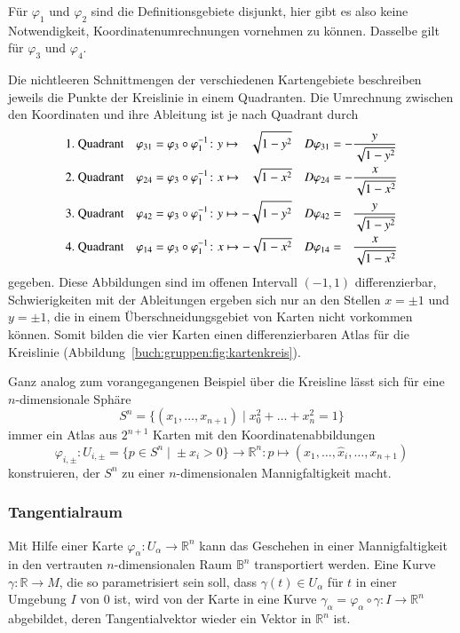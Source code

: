 \begin{beispiel}
Für $\varphi_1$ und $\varphi_2$ sind die Definitionsgebiete disjunkt,
hier gibt es also keine Notwendigkeit, Koordinatenumrechnungen vornehmen
zu können.
Dasselbe gilt für $\varphi_3$ und $\varphi_4$.

Die nichtleeren Schnittmengen der verschiedenen Kartengebiete beschreiben
jeweils die Punkte der Kreislinie in einem Quadranten.
Die Umrechnung zwischen den Koordinaten und ihre Ableitung
ist je nach Quadrant durch
\begin{align*}
&\text{1.~Quadrant}&
\varphi_{31}
&=
\varphi_3\circ\varphi_1^{-1}\colon y\mapsto\phantom{-}\sqrt{1-y^2\mathstrut}
&
D\varphi_{31}
&=
-\frac{y}{\sqrt{1-y^2\mathstrut}}
\\
&\text{2.~Quadrant}&
\varphi_{24}
&=
\varphi_3\circ\varphi_1^{-1}\colon x\mapsto\phantom{-}\sqrt{1-x^2\mathstrut}
&
D\varphi_{24}
&=
-\frac{x}{\sqrt{1-x^2\mathstrut}}
\\
&\text{3.~Quadrant}&
\varphi_{42}
&=
\varphi_3\circ\varphi_1^{-1}\colon y\mapsto-\sqrt{1-y^2\mathstrut}
&
D\varphi_{42}
&=
\phantom{-}\frac{y}{\sqrt{1-y^2\mathstrut}}
\\
&\text{4.~Quadrant}&
\varphi_{14}
&=
\varphi_3\circ\varphi_1^{-1}\colon x\mapsto-\sqrt{1-x^2\mathstrut}
&
D\varphi_{14}
&=
\phantom{-}\frac{x}{\sqrt{1-x^2\mathstrut}}
\end{align*}
gegeben.
Diese Abbildungen sind im offenen Intervall $(-1,1)$ differenzierbar,
Schwierigkeiten mit der Ableitungen ergeben sich nur an den Stellen
$x=\pm1$ und $y=\pm 1$, die in einem Überschneidungsgebiet von Karten
nicht vorkommen können.
Somit bilden die vier Karten einen differenzierbaren Atlas für
die Kreislinie (Abbildung~\ref{buch:gruppen:fig:kartenkreis}).
\end{beispiel}

\begin{beispiel}
Ganz analog zum vorangegangenen Beispiel über die Kreisline lässt sich
für eine $n$-di\-men\-sio\-nale Sphäre
\[
S^n = \{ (x_1,\dots,x_{n+1})\;|\; x_0^2+\dots+x_n^2=1\}
\]
immer ein Atlas aus $2^{n+1}$ Karten mit den Koordinatenabbildungen
\[
\varphi_{i,\pm}
\colon
U_{i,\pm}
=
\{p\in S^n\;|\; \pm x_i >0\}
\to
\mathbb{R}^n
:
p\mapsto (x_1,\dots,\hat{x}_i,\dots,x_{n+1})
\]
konstruieren, der $S^n$ zu einer $n$-dimensionalen Mannigfaltigkeit macht.
\end{beispiel}

\subsubsection{Tangentialraum}
Mit Hilfe einer Karte $\varphi_\alpha\colon U_\alpha\to\mathbb{R}^n$
kann das Geschehen in einer Mannigfaltigkeit in den vertrauten 
$n$-dimensionalen Raum $\mathbb{B}^n$ transportiert werden. 
Eine Kurve $\gamma\colon \mathbb{R}\to M$, die so parametrisiert sein
soll, dass $\gamma(t)\in U_\alpha$ für $t$ in einer Umgebung $I$ von $0$ ist,
wird von der Karte in eine Kurve
$\gamma_\alpha=\varphi_\alpha\circ\gamma\colon I\to \mathbb{R}^n$ 
abgebildet,
deren Tangentialvektor wieder ein Vektor in $\mathbb{R}^n$ ist.

